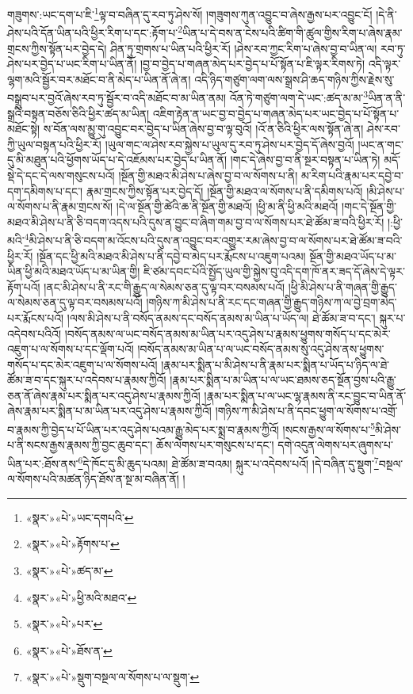 གཟུགས་:ཡང་དག་པ་ཇི་\footnote{«སྣར་»«པེ་»ཡང་དགཔའི་}ལྟ་བ་བཞིན་དུ་རབ་ཏུ་ཤེས་སོ། །གཟུགས་ཀུན་འབྱུང་བ་ཞེས་རྒྱས་པར་འབྱུང་ངོ། །དེ་ནི་ཤེས་པའི་དོན་ཡིན་པའི་ཕྱིར་རིག་པ་དང་:རྟོག་པ་\footnote{«སྣར་»«པེ་»རྟོགས་པ་}ཡིན་པ་དེ་བས་ན་ངེས་པའི་ཚིག་གི་ཚུལ་གྱིས་རིག་པ་ཞེས་རྣམ་གྲངས་ཀྱིས་སྟོན་པར་བྱེད་དེ། ཤིན་ཏུ་གྲགས་པ་ཡིན་པའི་ཕྱིར་རོ། །ཤེས་རབ་ཀྱང་རིག་པ་ཞེས་བྱ་བ་ཡིན་ལ། རབ་ཏུ་ཤེས་པར་བྱེད་པ་ཡང་རིག་པ་ཡིན་ནོ། །བྱ་བ་བྱེད་པ་གཞན་མེད་པར་བྱེད་པ་པོ་སྟོན་པ་ཇི་ལྟར་རིགས་ཏེ། འདི་ལྟར་ལྷག་མའི་སྦྱོར་བར་མཐོང་བ་ནི་མེད་པ་ཡིན་ནོ་ཞེ་ན། འདི་ཉིད་གཙུག་ལག་ལས་སྒྲས་ཤི་ཆད་གཉིས་ཀྱིས་རྗེས་སུ་བསྒྲུབ་པར་བྱའོ་ཞེས་རབ་ཏུ་སྦྱོར་བ་འདི་མཐོང་བ་མ་ཡིན་ནམ། འོན་ཏེ་གཙུག་ལག་དེ་ཡང་:ཚད་མ་མ་\footnote{«སྣར་»«པེ་»ཚད་མ་}ཡིན་ན་ནི་སྒྲའི་བསྟན་བཅོས་ཅིའི་ཕྱིར་ཚད་མ་ཡིན། འཇིག་རྟེན་ན་ཡང་བྱ་བ་བྱེད་པ་གཞན་མེད་པར་ཡང་བྱེད་པ་པོ་སྟོན་པ་མཐོང་སྟེ། ས་བོན་ལས་མྱུ་གུ་འབྱུང་བར་བྱེད་པ་ཡིན་ཞེས་བྱ་བ་ལྟ་བུའོ། །འོ་ན་ཅིའི་ཕྱིར་ལས་སྟོན་ཞེ་ན། ཤེས་རབ་ཀྱི་ཡུལ་བསྟན་པའི་ཕྱིར་རོ། །ཡུལ་གང་ལ་ཤེས་རབ་སྐྱེས་པ་ཡུལ་དུ་རབ་ཏུ་ཤེས་པར་བྱེད་དོ་ཞེས་བྱའོ། །ཡང་ན་གང་དུ་མི་མཐུན་པའི་ཕྱོགས་ཡོད་པ་དེ་འཇོམས་པར་བྱེད་པ་ཡིན་ནོ། །གང་དེ་ཞེས་བྱ་བ་ནི་སྔར་བསྟན་པ་ཡིན་ཏེ། མདོ་སྡེ་དེ་དང་དེ་ལས་གསུངས་པའོ། །སྔོན་གྱི་མཐའ་མི་ཤེས་པ་ཞེས་བྱ་བ་ལ་སོགས་པ་ནི། མ་རིག་པའི་རྣམ་པར་དབྱེ་བ་དག་དམིགས་པ་དང་། རྣམ་གྲངས་ཀྱིས་སྟོན་པར་བྱེད་དོ། །སྔོན་གྱི་མཐའ་ལ་སོགས་པ་ནི་དམིགས་པའོ། །མི་ཤེས་པ་ལ་སོགས་པ་ནི་རྣམ་གྲངས་སོ། །དེ་ལ་སྔོན་གྱི་ཚེའི་ཆ་ནི་སྔོན་གྱི་མཐའོ། །ཕྱི་མ་ནི་ཕྱི་མའི་མཐའོ། །གང་དེ་སྔོན་གྱི་མཐའ་མི་ཤེས་པ་ནི་ཅི་བདག་འདས་པའི་དུས་ན་བྱུང་བ་ཞིག་གམ་བྱ་བ་ལ་སོགས་པར་ཐེ་ཚོམ་ཟ་བའི་ཕྱིར་རོ། །:ཕྱི་མའི་\footnote{«སྣར་»«པེ་»ཕྱི་མའི་མཐའ་}མི་ཤེས་པ་ནི་ཅི་བདག་མ་འོངས་པའི་དུས་ན་འབྱུང་བར་འགྱུར་རམ་ཞེས་བྱ་བ་ལ་སོགས་པར་ཐེ་ཚོམ་ཟ་བའི་ཕྱིར་རོ། །སྔོན་དང་ཕྱི་མའི་མཐའ་མི་ཤེས་པ་ནི་དབྱེ་བ་མེད་པར་རྨོངས་པ་འཇུག་པའམ། སྔོན་གྱི་མཐའ་ཡོད་པ་མ་ཡིན་ཕྱི་མའི་མཐའ་ཡོད་པ་མ་ཡིན་གྱི། ཇི་ཙམ་དབང་པོའི་སྤྱོད་ཡུལ་གྱི་སྐྱེས་བུ་འདི་དག་ཁོ་ནར་ཟད་དོ་ཞེས་དེ་ལྟར་རྟོག་པའོ། །ནང་མི་ཤེས་པ་ནི་རང་གི་རྒྱུད་ལ་སེམས་ཅན་དུ་ལྟ་བར་བསམས་པའོ། །ཕྱི་མི་ཤེས་པ་ནི་གཞན་གྱི་རྒྱུད་ལ་སེམས་ཅན་དུ་ལྟ་བར་བསམས་པའོ། །གཉིས་ཀ་མི་ཤེས་པ་ནི་རང་དང་གཞན་གྱི་རྒྱུད་གཉིས་ཀ་ལ་བྱེ་བྲག་མེད་པར་རྨོངས་པའོ། །ལས་མི་ཤེས་པ་ནི་བསོད་ནམས་དང་བསོད་ནམས་མ་ཡིན་པ་ཡོད་ལ། ཐེ་ཚོམ་ཟ་བ་དང་། སྐུར་པ་འདེབས་པའིའོ། །བསོད་ནམས་ལ་ཡང་བསོད་ནམས་མ་ཡིན་པར་འདུ་ཤེས་པ་རྣམས་ཕྱུགས་གསོད་པ་དང་མེར་འཇུག་པ་ལ་སོགས་པ་དང་ལྡོག་པའོ། །བསོད་ནམས་མ་ཡིན་པ་ལ་ཡང་བསོད་ནམས་སུ་འདུ་ཤེས་ནས་ཕྱུགས་གསོད་པ་དང་མེར་འཇུག་པ་ལ་སོགས་པའོ། །རྣམ་པར་སྨིན་པ་མི་ཤེས་པ་ནི་རྣམ་པར་སྨིན་པ་ཡོད་པ་ཉིད་ལ་ཐེ་ཚོམ་ཟ་བ་དང་སྐུར་པ་འདེབས་པ་རྣམས་ཀྱིའོ། །རྣམ་པར་སྨིན་པ་མ་ཡིན་པ་ལ་ཡང་ཐམས་ཅད་སྔོན་བྱས་པའི་རྒྱུ་ཅན་ནོ་ཞེས་རྣམ་པར་སྨིན་པར་འདུ་ཤེས་པ་རྣམས་ཀྱིའོ། །རྣམ་པར་སྨིན་པ་ལ་ཡང་ལྷ་རྣམས་ནི་རང་བྱུང་བ་ཡིན་ནོ་ཞེས་རྣམ་པར་སྨིན་པ་མ་ཡིན་པར་འདུ་ཤེས་པ་རྣམས་ཀྱིའོ། །གཉིས་ཀ་མི་ཤེས་པ་ནི་དབང་ཕྱུག་ལ་སོགས་པ་འགྲོ་བ་རྣམས་ཀྱི་བྱེད་པ་པོ་ཡིན་པར་འདུ་ཤེས་པའམ་རྒྱུ་མེད་པར་སྨྲ་བ་རྣམས་ཀྱིའོ། །སངས་རྒྱས་ལ་སོགས་པ་\footnote{«སྣར་»«པེ་»པར་}མི་ཤེས་པ་ནི་སངས་རྒྱས་རྣམས་ཀྱི་བྱང་ཆུབ་དང་། ཆོས་ལེགས་པར་གསུངས་པ་དང་། དགེ་འདུན་ལེགས་པར་ཞུགས་པ་ཡིན་པར་:ཐོས་ནས་\footnote{«སྣར་»«པེ་»ཐོས་ན་}དེ་ཁོང་དུ་མི་ཆུད་པའམ། ཐེ་ཚོམ་ཟ་བའམ། སྐུར་པ་འདེབས་པའོ། །དེ་བཞིན་དུ་སྡུག་\footnote{«སྣར་»«པེ་»སྡུག་བསྔལ་ལ་སོགས་པ་ལ་སྡུག་}བསྔལ་ལ་སོགས་པའི་མཚན་ཉིད་ཐོས་ན་སྔ་མ་བཞིན་ནོ། །
